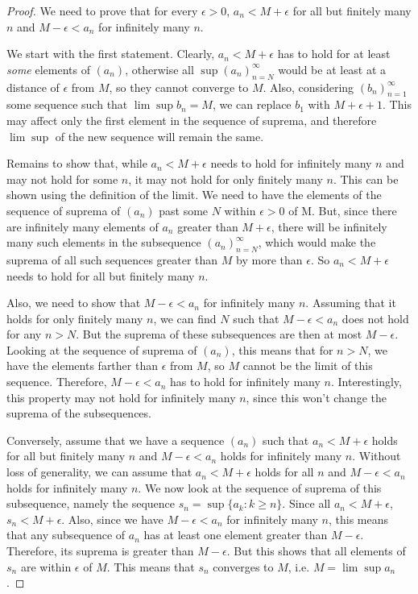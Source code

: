 \begin{proof}
We need to prove that for every $\epsilon > 0$, $a_n < M + \epsilon$ for all but finitely many $n$ and $M-\epsilon < a_n$ for infinitely many $n$.

We start with the first statement. Clearly, $a_n < M + \epsilon$ has to hold for at least \textit{some} elements of $(a_n)$, otherwise all $\sup (a_n)_{n=N}^{\infty}$ would be at least at a distance of $\epsilon$ from $M$, so they cannot converge to $M$. Also, considering $(b_n)_{n=1}^{\infty}$ some sequence such that $\lim \sup b_n = M$, we can replace $b_1$ with $M + \epsilon + 1$. This may affect only the first element in the sequence of suprema, and therefore $\lim \sup$ of the new sequence will remain the same.

Remains to show that, while $a_n < M + \epsilon$ needs to hold for infinitely many $n$ and may not hold for some $n$, it may not hold for only finitely many $n$. This can be shown using the definition of the limit. We need to have the elements of the sequence of suprema of $(a_n)$ past some $N$ within $\epsilon > 0$ of M. But, since there are infinitely many elements of $a_n$ greater than $M + \epsilon$, there will be infinitely many such elements in the subsequence $(a_n)_{n=N}^{\infty}$, which would make the suprema of all such sequences greater than $M$ by more than $\epsilon$. So $a_n < M + \epsilon$ needs to hold for all but finitely many $n$.

Also, we need to show that $M-\epsilon < a_n$ for infinitely many $n$. Assuming that it holds for only finitely many $n$, we can find $N$ such that $M-\epsilon < a_n$ does not hold for any $n>N$. But the suprema of these subsequences are then at most $M-\epsilon$. Looking at the sequence of suprema of $(a_n)$, this means that for $n>N$, we have the elements farther than $\epsilon$ from $M$, so $M$ cannot be the limit of this sequence. Therefore, $M-\epsilon < a_n$ has to hold for infinitely many $n$. Interestingly, this property may not hold for infinitely many $n$, since this won't change the suprema of the subsequences.

Conversely, assume that we have a sequence $(a_n)$ such that $a_n < M + \epsilon$ holds for all but finitely many $n$ and $M-\epsilon < a_n$ holds for infinitely many $n$. Without loss of generality, we can assume that $a_n < M + \epsilon$ holds for all $n$ and $M-\epsilon < a_n$ holds for infinitely many $n$. We now look at the sequence of suprema of this subsequence, namely the sequence $s_n = \sup\{a_k:k \geq n\}$. Since all $a_n < M + \epsilon$, $s_n < M + \epsilon$. Also, since we have $M-\epsilon < a_n$ for infinitely many $n$, this means that any subsequence of $a_n$ has at least one element greater than $M-\epsilon$. Therefore, its suprema is greater than $M-\epsilon$. But this shows that all elements of $s_n$ are within $\epsilon$ of $M$. This means that $s_n$ converges to $M$, i.e. $M = \lim \sup a_n$.

\end{proof}

